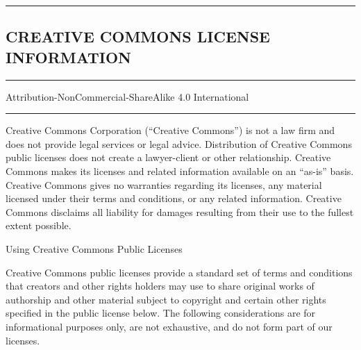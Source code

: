 \documentclass[
]{scrbook}
\begin{document}
\begin{center}\rule{0.5\linewidth}{0.5pt}\end{center}

\hypertarget{creative-commons-license-information}{%
\subsection{CREATIVE COMMONS LICENSE
INFORMATION}\label{creative-commons-license-information}}

\begin{center}\rule{0.5\linewidth}{0.5pt}\end{center}

Attribution-NonCommercial-ShareAlike 4.0 International

\begin{center}\rule{0.5\linewidth}{0.5pt}\end{center}

Creative Commons Corporation (``Creative Commons'') is not a law firm
and does not provide legal services or legal advice. Distribution of
Creative Commons public licenses does not create a lawyer-client or
other relationship. Creative Commons makes its licenses and related
information available on an ``as-is'' basis. Creative Commons gives no
warranties regarding its licenses, any material licensed under their
terms and conditions, or any related information. Creative Commons
disclaims all liability for damages resulting from their use to the
fullest extent possible.

Using Creative Commons Public Licenses

Creative Commons public licenses provide a standard set of terms and
conditions that creators and other rights holders may use to share
original works of authorship and other material subject to copyright and
certain other rights specified in the public license below. The
following considerations are for informational purposes only, are not
exhaustive, and do not form part of our licenses.
\end{document}
